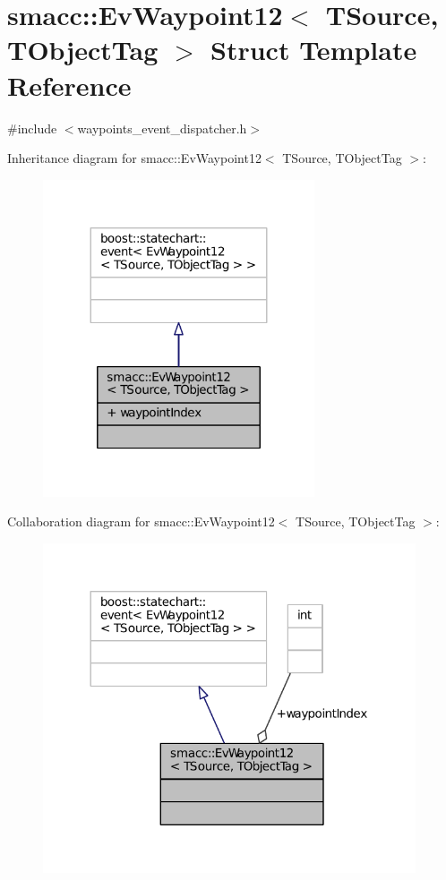 \hypertarget{structsmacc_1_1EvWaypoint12}{}\section{smacc\+:\+:Ev\+Waypoint12$<$ T\+Source, T\+Object\+Tag $>$ Struct Template Reference}
\label{structsmacc_1_1EvWaypoint12}


{\ttfamily \#include $<$waypoints\+\_\+event\+\_\+dispatcher.\+h$>$}



Inheritance diagram for smacc\+:\+:Ev\+Waypoint12$<$ T\+Source, T\+Object\+Tag $>$\+:
\nopagebreak
\begin{figure}[H]
\begin{center}
\leavevmode
\includegraphics[width=227pt]{structsmacc_1_1EvWaypoint12__inherit__graph}
\end{center}
\end{figure}


Collaboration diagram for smacc\+:\+:Ev\+Waypoint12$<$ T\+Source, T\+Object\+Tag $>$\+:
\nopagebreak
\begin{figure}[H]
\begin{center}
\leavevmode
\includegraphics[width=312pt]{structsmacc_1_1EvWaypoint12__coll__graph}
\end{center}
\end{figure}
